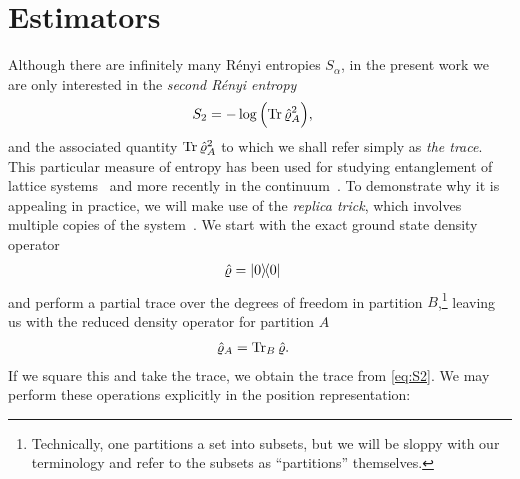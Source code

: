 \section{Estimators}

\label{sec:estimators}

Although there are infinitely many Rényi entropies $S_\alpha$, in the present work we are only interested in the \emph{second Rényi entropy}
\begin{align}
	S_2
	&= -\log{\left( \operatorname{Tr}{\hat{\varrho}_A^2} \right)},
		\label{eq:S2}
\end{align}
and the associated quantity $\operatorname{Tr}{\hat{\varrho}_A^2}$ to which we shall refer simply as \emph{the trace}.
This particular measure of entropy has been used for studying entanglement of lattice systems~\cite{hastings2010measuring,stephan2012renyi} and more recently in the continuum~\cite{herdman2014path,herdman2014particle}.
To demonstrate why it is appealing in practice, we will make use of the \emph{replica trick}, which involves multiple copies of the system~\cite{hastings2010measuring}.
We start with the exact ground state density operator
\begin{align}
	\hat{\varrho}
	&= \ket{0}\!\!\bra{0}
\end{align}
and perform a partial trace over the degrees of freedom in partition $B$,\footnote{
	Technically, one partitions a set into subsets, but we will be sloppy with our terminology and refer to the subsets as ``partitions'' themselves.
} leaving us with the reduced density operator for partition $A$
\begin{align}
	\hat{\varrho}_A
	&= \operatorname{Tr}_B{\hat{\varrho}}.
\end{align}
If we square this and take the trace, we obtain the trace from \cref{eq:S2}.
We may perform these operations explicitly in the position representation:
